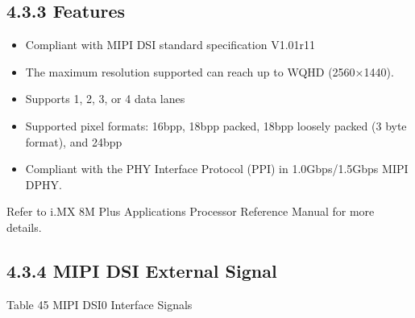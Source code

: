 \documentclass[letterpaper,10pt,openany,english]{sphinxmanual}
\begin{document}
\subsection{4.3.3 Features}
\label{\detokenize{hardware:id3}}\begin{itemize}
\item {} 
\sphinxAtStartPar
Compliant with MIPI DSI standard specification V1.01r11

\item {} 
\sphinxAtStartPar
The maximum resolution supported can reach up to WQHD (2560×1440).

\item {} 
\sphinxAtStartPar
Supports 1, 2, 3, or 4 data lanes

\item {} 
\sphinxAtStartPar
Supported pixel formats: 16bpp, 18bpp packed, 18bpp loosely packed (3 byte format), and 24bpp

\item {} 
\sphinxAtStartPar
Compliant with the PHY Interface Protocol (PPI) in 1.0Gbps/1.5Gbps MIPI DPHY.

\end{itemize}

\sphinxAtStartPar
Refer to i.MX 8M Plus Applications Processor Reference Manual for more details.


\subsection{4.3.4 MIPI DSI External Signal}
\label{\detokenize{hardware:mipi-dsi-external-signal}}
\sphinxAtStartPar
Table 4\sphinxhyphen{}5 MIPI DSI0 Interface Signals
\end{document}
